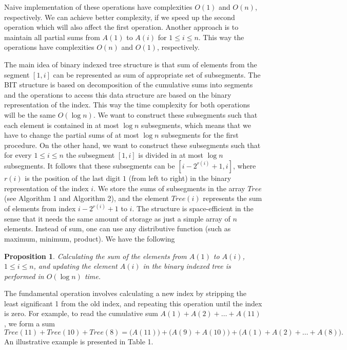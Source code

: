\documentclass[11pt,letter]{article}
\newtheorem{prop}[thm]{Proposition}
\begin{document}
Naive implementation of these operations have complexities $O (1)$ and $O(n)$, respectively. We can
achieve better complexity, if we speed up the second operation which will also affect the first
operation. Another approach is to maintain all partial sums from $A(1)$ to $A(i)$ for $1 \leq i
\leq n$. This way the operations have complexities $O (n)$ and $O (1)$, respectively.

The main idea of binary indexed tree structure is that sum of elements from the segment $[1, i]$
can be represented as sum of appropriate set of subsegments. The BIT structure is based on
decomposition of the cumulative sums into segments and the operations to access this data structure
are based on the binary representation of the index. This way the time complexity for both
operations will be the same $O(\log n)$. We want to construct these subsegments such that each
element is contained in at most $\log n$ subsegments, which means that we have to change the
partial sums of at most $\log n$ subsegments for the first procedure. On the other hand, we want to
construct these subsegments such that for every $1 \leq i \leq n$ the subsegment $[1, i]$ is
divided in at most $\log n$ subsegments. It follows that these subsegments can be $[i - 2^{r(i)} +
1, i]$, where $r(i)$ is the position of the last digit $1$ (from left to right) in the binary
representation of the index $i$. We store the sums of subsegments in the array $Tree$ (see
Algorithm 1 and Algorithm 2), and the element $Tree (i)$ represents the sum of elements from index
$i - 2^{r(i)} + 1$ to $i$. The structure is space-efficient in the sense that it needs the same
amount of storage as just a simple array of $n$ elements. Instead of sum, one can use any
distributive function (such as maximum, minimum, product). We have the following

\begin{prop}
Calculating the sum of the elements from $A (1)$ to $A (i)$, $1 \leq i \leq n$, and updating the
element $A (i)$ in the binary indexed tree is performed in $O (\log n)$ time.
\end{prop}

The fundamental operation involves calculating a new index by stripping the least significant 1
from the old index, and repeating this operation until the index is zero. For example, to read the
cumulative sum $A (1) + A (2) + \ldots + A (11)$, we form a sum
$$
Tree (11) + Tree (10) + Tree (8) = \Big(A (11) \Big) + \Big (A (9) + A (10) \Big) + \Big(A(1) + A
(2) + \ldots + A (8)\Big ).
$$
An illustrative example is presented in Table 1.
\end{document}
